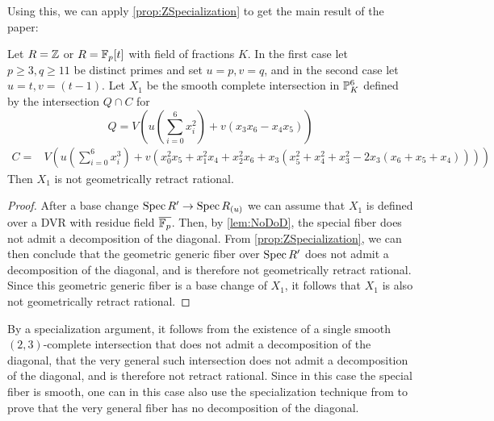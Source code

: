 Using this, we can apply \cref{prop:ZSpecialization} to get the main result of the paper:

\begin{theorem}
  Let $R=\Z$ or $R=\F_p[t]$ with field of fractions $K$. In the first case let $p \geq 3, q \geq 11$ be distinct primes and set $u=p, v=q$, and in the second case let $u=t,v=(t-1)$. Let $X_1$ be the smooth complete intersection in $\P^6_{K}$ defined by the intersection $Q \cap C$ for
\begin{equation*}
	\label{eq:Quadric3}
	Q = V\left( u \left(\sum_{i=0}^6 x_i^2 \right) + v(x_3x_6-x_4x_5)\right) 
\end{equation*}
\begin{equation*}
	\label{eq:Cubic3}
	\begin{split}
		C = &V\left( u \left(\sum_{i=0}^6 x_i^3 \right) + v(x_0^2x_5 + x_1^2x_4 + x_2^2x_6 + x_3(x_5^2+x_4^2+x_3^2 -2x_3(x_6 + x_5 + x_4))) \right)
	\end{split}
\end{equation*}
Then $X_1$ is not geometrically retract rational.
\end{theorem}
\begin{proof}
	After a base change $\Spec R' \to \Spec R_{(u)}$ we can assume that $X_1$ is defined over a DVR with residue field $\overline{\F_p}$. Then, by \cref{lem:NoDoD}, the special fiber does not admit a decomposition of the diagonal. From \cref{prop:ZSpecialization}, we can then conclude that the geometric generic fiber over $\Spec R'$ does not admit a decomposition of the diagonal, and is therefore not geometrically retract rational. Since this geometric generic fiber is a base change of $X_1$, it follows that $X_1$ is also not geometrically retract rational.
\end{proof}

\begin{remark}
By a specialization argument, it follows from the existence of a single smooth $(2,3)$-complete intersection that does not admit a decomposition of the diagonal, that the very general such intersection does not admit a decomposition of the diagonal, and is therefore not retract rational. Since in this case the special fiber is smooth, one can in this case also use the specialization technique from \cite[Théorème 1.12]{ColliotThelenePirutka} to prove that the very general fiber has no decomposition of the diagonal.
\end{remark}

\printbibliography[heading = subbibliography]
\stopcontents[chapters]